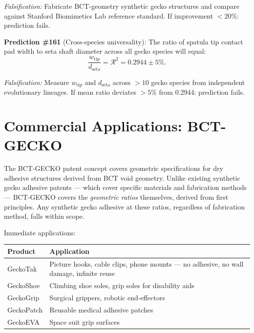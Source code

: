 \documentclass[12pt,twocolumn]{article}
\begin{document}
\textit{Falsification:} Fabricate BCT-geometry synthetic gecko
structures and compare against Stanford Biomimetics Lab
reference standard. If improvement $<20\%$: prediction fails.

\bigskip
\noindent\textbf{Prediction \#161} (Cross-species universality):
The ratio of spatula tip contact pad width to seta shaft
diameter across all gecko species will equal:
\begin{equation}
  \frac{w_{\mathrm{tip}}}{d_{\mathrm{seta}}}
  = \mathcal{R}^2 = 0.2944 \pm 5\%.
\end{equation}

\textit{Falsification:} Measure $w_{\mathrm{tip}}$ and
$d_{\mathrm{seta}}$ across $>10$ gecko species from independent
evolutionary lineages. If mean ratio deviates $>5\%$ from
0.2944: prediction fails.

\section{Commercial Applications: BCT-GECKO}

The BCT-GECKO patent concept covers geometric specifications
for dry adhesive structures derived from BCT void geometry.
Unlike existing synthetic gecko adhesive patents --- which
cover specific materials and fabrication methods --- BCT-GECKO
covers the \textit{geometric ratios} themselves, derived from
first principles. Any synthetic gecko adhesive at these ratios,
regardless of fabrication method, falls within scope.

Immediate applications:

\begin{center}
{\small
\begin{tabular}{@{}p{2cm}p{3.3cm}@{}}
\toprule
Product & Application \\
\midrule
GeckoTak & Picture hooks, cable clips, phone mounts --- no adhesive, no wall damage, infinite reuse \\
GeckoShoe & Climbing shoe soles, grip soles for disability aids \\
GeckoGrip & Surgical grippers, robotic end-effectors \\
GeckoPatch & Reusable medical adhesive patches \\
GeckoEVA & Space suit grip surfaces \\
\bottomrule
\end{tabular}}
\end{center}
\end{document}
